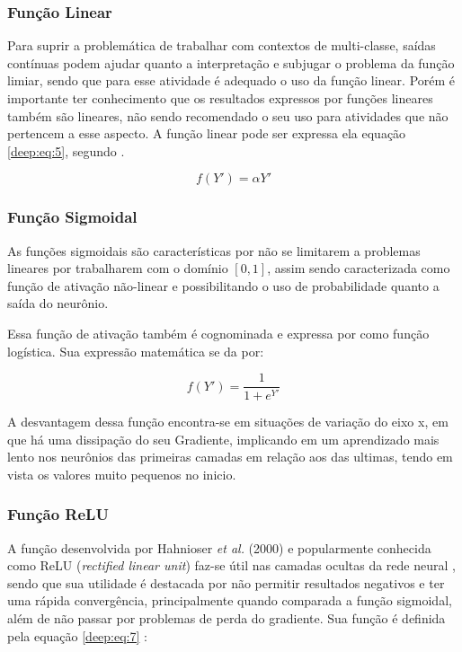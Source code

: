 \subsubsection{Função Linear}
Para suprir a problemática de trabalhar com contextos de multi-classe, saídas contínuas podem ajudar quanto a interpretação e subjugar o problema da função limiar, sendo que para esse atividade é adequado o uso da função linear. Porém é importante ter conhecimento que os resultados expressos por funções lineares também são lineares, não sendo recomendado o seu uso para atividades que não pertencem a esse aspecto. A função linear pode ser expressa ela equação \ref{deep:eq:5}, segundo \cite{Rosenblatt1958}.

\begin{equation}
    \label{deep:eq:5}
    f(Y') = \alpha Y'
\end{equation}


\subsubsection{Função Sigmoidal}
As funções sigmoidais são características por não se limitarem a problemas lineares por trabalharem com o domínio $[0,1]$, assim sendo caracterizada como função de ativação não-linear e possibilitando o uso de probabilidade quanto a saída do neurônio.

Essa função de ativação também é cognominada e expressa por \cite{glorot2011deep} como função logística. Sua expressão matemática se da por:

\begin{equation}
    \label{deep:eq:6}
    f(Y') = \frac{1}{1 + e^{Y'}}
\end{equation}

A desvantagem dessa função encontra-se em situações de variação do eixo x, em que há uma  dissipação do seu Gradiente, implicando em um aprendizado mais lento nos neurônios das primeiras camadas em relação aos das ultimas, tendo em vista os valores muito pequenos no inicio.

\subsubsection{Função ReLU}
A função desenvolvida por Hahnioser \textit{et al.} (2000)\cite{Hahnioser2000DigitalCircuit} e popularmente conhecida como ReLU (\textit{rectified linear unit}) faz-se útil nas camadas ocultas da rede neural \cite{Goodfellow2016}, sendo que sua utilidade é destacada por não permitir resultados negativos \cite{Dahl2013ImprovingDropout} e ter uma rápida convergência, principalmente quando comparada a função sigmoidal, além de não passar por problemas de perda do gradiente. Sua função é definida pela equação \ref{deep:eq:7} \cite{Hahnioser2000DigitalCircuit}:

